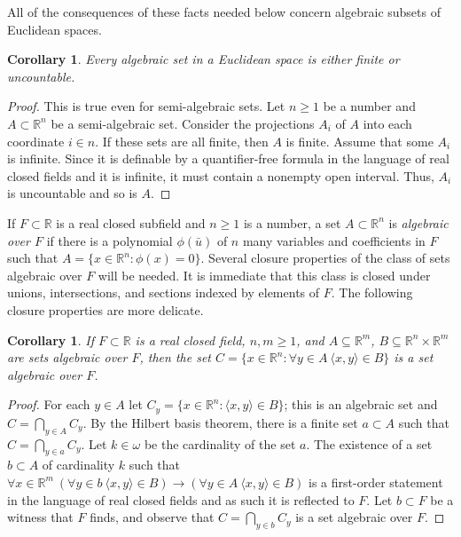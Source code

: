 \documentclass{article}
\newcommand{\gw}{\omega}
\newtheorem{corollary}[theorem]{Corollary}
\theoremstyle{definition}
\begin{document}
\noindent All of the consequences of these facts needed below concern algebraic subsets of Euclidean spaces.

\begin{corollary}
\label{c1}
Every algebraic set in a Euclidean space is either finite or uncountable.
\end{corollary}

\begin{proof}
This is true even for semi-algebraic sets. Let $n\geq 1$ be a number and $A\subset\mathbb{R}^n$ be a semi-algebraic set. Consider the projections $A_i$ of $A$ into each coordinate $i\in n$. If these sets are all finite, then $A$ is finite. Assume that some $A_i$ is infinite. Since it is definable by a quantifier-free formula in the language of real closed fields and it is infinite, it must contain a nonempty open interval. Thus, $A_i$ is uncountable and so is $A$.
\end{proof}


\noindent If $F\subset \mathbb{R}$ is a real closed subfield and $n\geq 1$ is a number, a set $A\subset\mathbb{R}^n$ is \emph{algebraic over $F$} if there is a polynomial $\phi(\bar u)$ of $n$ many variables and coefficients in $F$ such that $A=\{x\in \mathbb{R}^n\colon \phi(x)=0\}$. Several closure properties of the class of sets algebraic over $F$ will be needed. It is immediate that this class is closed under unions, intersections, and sections indexed by elements of $F$. The following closure properties are more delicate.

\begin{corollary}
\label{c2}
If $F\subset\mathbb{R}$ is a real closed field, $n, m\geq 1$, and $A\subseteq \mathbb{R}^m$, $B\subseteq\mathbb{R}^n\times\mathbb{R}^m$ are sets algebraic over $F$, then the set $C=\{x\in\mathbb{R}^n\colon \forall y\in A\ \langle x, y\rangle\in B\}$ is a set algebraic over $F$.
\end{corollary}

\begin{proof}
For each $y\in A$ let $C_y=\{x\in\mathbb{R}^n\colon \langle x, y\rangle\in B\}$; this is an algebraic set and $C=\bigcap_{y\in A}C_y$. By the Hilbert basis theorem, there is a finite set $a\subset A$ such that $C=\bigcap_{y\in a}C_y$. Let $k\in\gw$ be the cardinality of the set $a$. The existence of a set $b\subset A$ of cardinality $k$ such that $\forall x\in\mathbb{R}^m\ (\forall y\in b\ \langle x, y\rangle\in B)\to (\forall y\in A\ \langle x, y\rangle\in B)$ is a first-order statement in the language of real closed fields and as such it is reflected to $F$. Let $b\subset F$ be a witness that $F$ finds, and observe that $C=\bigcap_{y\in b}C_y$ is a set algebraic over $F$.
\end{proof}
\end{document}
